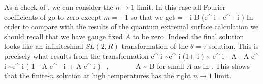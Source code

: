 As a check of , we can consider the $n\to 1$ limit. In this case all Fourier 
coefficients of   go to zero except $m= \pm 1$ so that we get 
\be {}
\delta \theta = - i { \kappa  \over B} (e^{ i \tau} - e^{ - i \tau } ) 
\ee
In order to compare with the results of the quantum extremal surface calculation we should recall that we have gauge fixed $A$ to be zero. 
Indeed the final solution  looks like an infinitesimal $SL(2,R)$ transformation of the $\theta = \tau$ solution. This is precisely what results from the transformation 
\be
 e^{ i \theta } \sim  e^{ i \tau }(1+ i \delta \theta) \sim  { e^{ i \tau} - A  - A e^{ i \tau } } \sim e^{ i \tau} ( 1 - A e^{ - i \tau} + A e^{ i \tau } ) ~,~~~~~~~ A \sim { \kappa \over B} 
 \ee
for small $A$ as in . This shows that the finite-$n$ solution at high temperatures has the right $n\to 1$ limit. 



